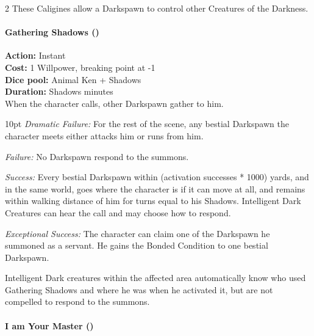 \begin{multicols}{2}
These Caligines allow a Darkspawn to control other Creatures of the Darkness.\\

\paragraph*{Gathering Shadows (\textbullet\textbullet\textbullet\textbullet\textbullet)}

\noindent \textbf{Action:} Instant\\

\noindent \textbf{Cost:} 1 Willpower, breaking point at -1\\

\noindent \textbf{Dice pool:} Animal Ken + Shadows\\

\noindent \textbf{Duration:} Shadows minutes\\

When the character calls, other Darkspawn gather to him. \\

\begin{myindentpar}{10pt}    \emph{Dramatic Failure:} For the rest of the scene, any bestial Darkspawn the character meets either attacks him or runs from him.

    \emph{Failure:}  No Darkspawn respond to the summons.

    \emph{Success:}  Every bestial Darkspawn within (activation successes * 1000) yards, and in the same world, goes where the character is if it can move at all, and remains within walking distance of him for turns equal to his Shadows. Intelligent Dark Creatures can hear the call and may choose how to respond.

    \emph{Exceptional Success:} The character can claim one of the Darkspawn he summoned as a servant. He gains the Bonded Condition to one bestial Darkspawn.\\\end{myindentpar}

Intelligent Dark creatures within the affected area automatically know who used Gathering Shadows and where he was when he activated it, but are not compelled to respond to the summons.\\

\paragraph*{I am Your Master (\textbullet\textbullet\textbullet\textbullet\textbullet)}


\end{multicols}
